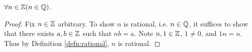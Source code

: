 \guard



\begin{prop}
\label{prop:integersAreRational}
  $\forall n\in\mathbb{Z}( n\in\mathbb{Q} )$.
\end{prop}
\begin{proof}
  Fix $n\in\mathbb{Z}$ arbitrary.
  To show $n$ is rational, i.e. $n\in\mathbb{Q}$, it suffices to show that there exists $a,b\in\mathbb{Z}$ such that $nb=a$.
  Note $n,1\in\mathbb{Z}$, $1\not=0$, and $1n = n$.
  Thus by Definition \ref{defn:rational}, $n$ is rational.
\end{proof}
